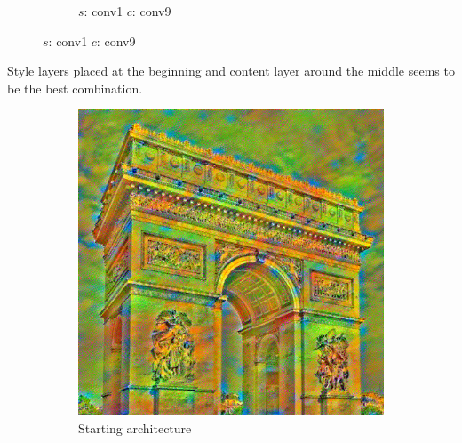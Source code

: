 \documentclass[12pt]{beamer}
\begin{document}
\begin{frame}
\begin{figure}[H]
\begin{subfigure}[b]{0.2\textwidth}
                \caption{$s$: conv1 $c$: conv9}
            \end{subfigure}
        \end{figure}
        
        \footnotesize{Style layers placed at the beginning and content layer around the middle seems to be the best combination.}
    \end{frame}
    
    \begin{frame}
        \begin{figure}[H]
            \centering
            \begin{subfigure}[b]{0.45\textwidth}
                \centering
                \includegraphics[width=\textwidth]{resources/gatys/layers/layers_default.png}
                \caption{Starting architecture}
            \end{subfigure}
            \hfill
            \begin{subfigure}[b]{0.45\textwidth}
                \centering

\end{subfigure}
\end{figure}
\end{frame}
\end{document}
